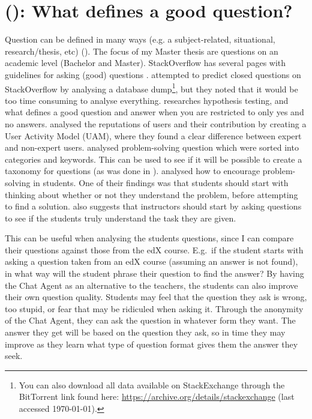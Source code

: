\section{ (): What defines a good question?}
\label{chapter3:define_good_question}
Question can be defined in many ways (e.g. a subject-related, situational, research/thesis, etc) (\citet[p.~3]{Boyer2010}). The focus of my Master thesis are questions on an 
academic level (Bachelor and Master). StackOverflow has several pages with guidelines for asking (good) questions 
 \cite{Stackoverflow.com2015,CommunityWiki2015,Stackoverflow.com2015a,Stackoverflow.com2015b,Stackoverflow.com2015c}. 
 \vspace{0.5em}\newline
\citet{Lezina2013} attempted to predict closed questions on StackOverflow by analysing a database dump\footnote{You can also download all data available on StackExchange through 
	the BitTorrent link found here: \url{https://archive.org/details/stackexchange} (last accessed \today).}, but they noted that it would be too time consuming to analyse 
everything. \citet{Slowiaczek1992} researches hypothesis testing, and what defines a good question and answer when you are restricted to only yes and no answers. 
\citet{Movshovitz-Attias2013} analysed the reputations of users and their contribution by creating a User Activity Model (UAM), where they found a clear difference between 
expert and non-expert users.
\vspace{0.5em}\newline
\citet{Ragonis2013} analysed problem-solving question which were sorted into categories and keywords. This can be used to see if it will be possible to create a taxonomy for 
questions (as was done in \citet{Nielsen2008}). \citet{Boyer2010} analysed how to encourage problem-solving in students. One of their findings was that students should start with 
thinking about whether or not they understand the problem, before attempting to find a solution. \citet{Boyer2010} also suggests that instructors should start by asking 
questions to see if the students truly understand the task they are given. 

This can be useful when analysing the students questions, since I can compare their questions against those from the edX course. E.g.~if the student starts with asking a question 
taken from an edX course (assuming an answer is not found), in what way will the student phrase their question to find the answer? 
\vspace{0.5em}\newline
By having the Chat Agent as an alternative to the teachers, the students can also improve their own question quality. Students may feel that the question they ask is wrong, too 
stupid, or fear that may be ridiculed when asking it. Through the anonymity of the Chat Agent, they can ask the question in whatever form they want. The answer they get will be 
based on the question they ask, so in time they may improve as they learn what type of question format gives them the answer they seek. 

\begin{comment}
I would argue that there are many different types of question. 
There are structured queries, where can be object, which query to longer to process. 
The next layer is information gathering questions. Questions designed to get information.
\end{comment}
